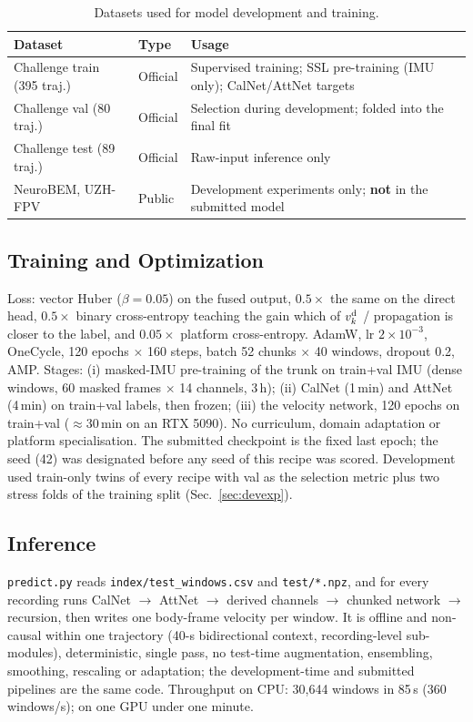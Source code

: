 \documentclass[letterpaper,10pt,conference]{ieeeconf}
\begin{document}
\begin{table}[htbp]
\centering\footnotesize
\caption{Datasets used for model development and training.}
\begin{tabular}{p{2.1cm} p{1.0cm} p{4.3cm}}
\toprule
Dataset & Type & Usage \\
\midrule
Challenge train (395 traj.) & Official & Supervised training; SSL pre-training (IMU only); CalNet/AttNet targets \\
Challenge val (80 traj.) & Official & Selection during development; folded into the final fit \\
Challenge test (89 traj.) & Official & Raw-input inference only \\
NeuroBEM, UZH-FPV & Public & Development experiments only; \textbf{not} in the submitted model \\
\bottomrule
\end{tabular}
\label{tab:datasets}
\end{table}

\subsection{Training and Optimization}
Loss: vector Huber ($\beta=0.05$) on the fused output, $0.5\times$ the same on the direct head,
$0.5\times$ binary cross-entropy teaching the gain which of $v^{\rm d}_k$ / propagation is closer to
the label, and $0.05\times$ platform cross-entropy. AdamW, lr $2\times10^{-3}$, OneCycle,
120 epochs $\times$ 160 steps, batch 52 chunks $\times$ 40 windows, dropout 0.2, AMP.
Stages: (i) masked-IMU pre-training of the trunk on train+val IMU (dense windows, 60 masked frames
$\times$ 14 channels, 3\,h); (ii) CalNet (1\,min) and AttNet (4\,min) on train+val labels, then
frozen; (iii) the velocity network, 120 epochs on train+val ($\approx$30\,min on an RTX 5090).
No curriculum, domain adaptation or platform specialisation. The submitted checkpoint is the fixed
last epoch; the seed (42) was designated before any seed of this recipe was scored. Development used
train-only twins of every recipe with val as the selection metric plus two stress folds of the
training split (Sec.~\ref{sec:devexp}).

\subsection{Inference}
\texttt{predict.py} reads \texttt{index/test\_windows.csv} and \texttt{test/*.npz}, and for every
recording runs CalNet $\to$ AttNet $\to$ derived channels $\to$ chunked network $\to$ recursion, then
writes one body-frame velocity per window. It is offline and non-causal within one trajectory
(40-s bidirectional context, recording-level sub-modules), deterministic, single pass, no
test-time augmentation, ensembling, smoothing, rescaling or adaptation; the development-time and
submitted pipelines are the same code. Throughput on CPU: 30,644 windows in 85\,s (360 windows/s);
on one GPU under one minute.
\end{document}
